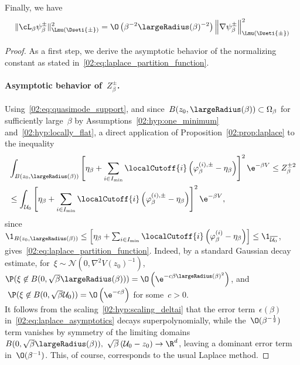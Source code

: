 \begin{proposition}
            Finally, we have
            \begin{equation}
                \label{02:eq:laplace_generator_local_estimate}
                \|\cL_\beta \psi_\beta^\pm\|^2_{\Lmu(\Dseti{\pm})} = \O\left(\beta^{-2}\largeRadius(\beta)^{-2}\right)\left\|\nabla\psi_\beta^\pm\right\|^2_{\Lmu(\Dseti{\pm})}
            \end{equation}
        \end{proposition}
        \begin{proof}
            As a first step, we derive the asymptotic behavior of the normalizing constant as stated in~\eqref{02:eq:laplace_partition_function}.
            \paragraph{Asymptotic behavior of~$Z_\beta^\pm$.\newline}
            Using~\eqref{02:eq:quasimode_support}, and since~$B(z_0,\largeRadius(\beta))\subset \Omega_\beta$ for sufficiently large~$\beta$ by Assumptions~\eqref{02:hyp:one_minimum} and~\eqref{02:hyp:locally_flat}, a direct application of Proposition~\ref{02:prop:laplace} to the inequality
            \[\begin{split}&\int_{B(z_0,\largeRadius(\beta))} \left[\eta_\beta+\sum_{i\in I_{\min}}\localCutoff{i}\left(\varphi_\beta^{(i),\pm}- \eta_\beta\right)\right]^2 \e^{-\beta V} \leq Z_\beta^{\pm 2}\\
                &\leq \int_{{\mathcal U_0}}\left[\eta_\beta+\sum_{i\in I_{\min}}\localCutoff{i}\left(\varphi_\beta^{(i),\pm}- \eta_\beta\right)\right]^2\e^{-\beta V},
            \end{split}\]
            since~$ \1_{B(z_0,\largeRadius(\beta))} \leq \left[\eta_\beta+\sum_{i\in I_{\min}}\localCutoff{i}\left(\varphi_\beta^{(i)}- \eta_\beta\right)\right] \leq \1_{\overline{\mathcal U_0}}$,
            gives~\eqref{02:eq:laplace_partition_function}. Indeed, by a standard Gaussian decay estimate, for~$\xi\sim\mathcal N(0,\nabla^2 V(z_0)^{-1})$,~$\P(\xi\not\in B(0,\sqrt\beta\largeRadius(\beta)))=\O\left(\e^{-c\beta\largeRadius(\beta)^2}\right)$, and $~\P(\xi\not\in B(0,\sqrt\beta {\mathcal U_0})) = \O\left(\e^{-c\beta}\right)$ for some~$c>0$.
            \\It follows from the scaling~\eqref{02:hyp:scaling_deltai} that the error term~$\epsilon(\beta)$ in~\eqref{02:eq:laplace_asymptotics} decays superpolynomially, while the~$\O(\beta^{-\frac12})$ term vanishes by symmetry of the limiting domains~$B(0,\sqrt\beta\largeRadius(\beta)),~\sqrt\beta\left({\mathcal U_0}-z_0\right)\to \R^d$, leaving a dominant error term in~$\O(\beta^{-1})$. This, of course, corresponds to the usual Laplace method.


\end{proof}
